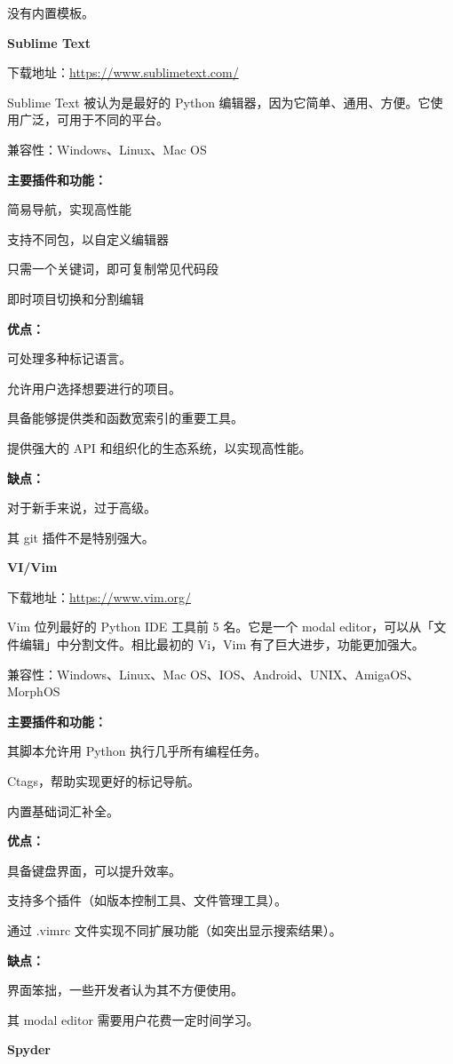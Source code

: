 \documentclass[]{ctexbook}
\begin{document}
没有内置模板。

\textbf{Sublime Text}

下载地址：\url{https://www.sublimetext.com/}

Sublime Text 被认为是最好的 Python 编辑器，因为它简单、通用、方便。它使用广泛，可用于不同的平台。

兼容性：Windows、Linux、Mac OS

\textbf{主要插件和功能：}

简易导航，实现高性能

支持不同包，以自定义编辑器

只需一个关键词，即可复制常见代码段

即时项目切换和分割编辑

\textbf{优点：}

可处理多种标记语言。

允许用户选择想要进行的项目。

具备能够提供类和函数宽索引的重要工具。

提供强大的 API 和组织化的生态系统，以实现高性能。

\textbf{缺点：}

对于新手来说，过于高级。

其 git 插件不是特别强大。

\textbf{VI/Vim}

下载地址：\url{https://www.vim.org/}

Vim 位列最好的 Python IDE 工具前 5 名。它是一个 modal editor，可以从「文件编辑」中分割文件。相比最初的 Vi，Vim 有了巨大进步，功能更加强大。

兼容性：Windows、Linux、Mac OS、IOS、Android、UNIX、AmigaOS、MorphOS

\textbf{主要插件和功能：}

其脚本允许用 Python 执行几乎所有编程任务。

Ctags，帮助实现更好的标记导航。

内置基础词汇补全。

\textbf{优点：}

具备键盘界面，可以提升效率。

支持多个插件（如版本控制工具、文件管理工具）。

通过 .vimrc 文件实现不同扩展功能（如突出显示搜索结果）。

\textbf{缺点：}

界面笨拙，一些开发者认为其不方便使用。

其 modal editor 需要用户花费一定时间学习。

\textbf{Spyder}
\end{document}

